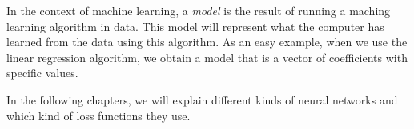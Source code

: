 In the context of machine learning, a \emph{model} is the result of running a maching learning algorithm in data. This model will represent what the computer has learned from the data using this algorithm. As an easy example, when we use the
linear regression algorithm, we obtain a model that is a vector of coefficients with specific values.

In the following chapters, we will explain different kinds of neural networks and which kind of loss functions they use. 


